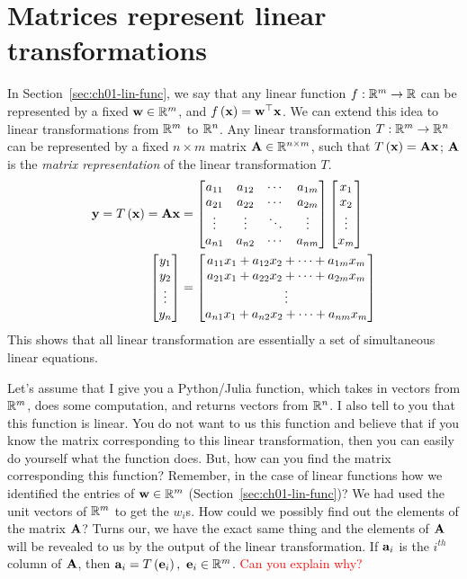 \section{Matrices represent linear transformations}\label{sec:ch03-mat-lin-trans}
In Section~\ref{sec:ch01-lin-func}, we say that any linear function $f: \mathbb{R}^m \to \mathbb{R}$ can be represented by a fixed $\mathbf{w} \in \mathbb{R}^m$, and $f\left( \mathbf{x}\right) = \mathbf{w}^\top\mathbf{x}$. We can extend this idea to linear transformations from $\mathbb{R}^m$ to $\mathbb{R}^n$. Any linear transformation $T: \mathbb{R}^m \to \mathbb{R}^n$ can be represented by a fixed $n \times m$ matrix $\mathbf{A} \in \mathbb{R}^{n \times m}$, such that $T\left( \mathbf{x}\right) = \mathbf{A}\mathbf{x}$; $\mathbf{A}$ is the \textit{matrix representation} of the linear transformation $T$.
\begin{equation}
    \begin{split}
        \mf{y} = T\pp{\mf{x}} = \mf{A}\mf{x} &= \bmxc a_{11} & a_{12} & \cdots & a_{1m}\\ a_{21} & a_{22} & \cdots & a_{2m}\\ \vdots & \vdots & \ddots & \vdots\\ a_{n1} & a_{n2} & \cdots & a_{nm} \emx \bmxc x_1 \\ x_2 \\ \vdots \\ x_m\emx \\
        \bmxc y_1 \\ y_2 \\ \vdots \\ y_n \emx &= \bmxc a_{11}x_1 + a_{12}x_2 + \cdots + a_{1m}x_m \\ 
        a_{21}x_1 + a_{22}x_2 + \cdots + a_{2m}x_m \\
        \vdots \\
        a_{n1}x_1 + a_{n2}x_2 + \cdots + a_{nm}x_m\emx 
    \end{split}
    \label{eq:ch03-lin-trans-mat-rep}
\end{equation}
This shows that all linear transformation are essentially a set of simultaneous linear equations.

Let's assume that I give you a Python/Julia function, which takes in vectors from $\mathbb{R}^m$, does some computation, and returns vectors from $\mathbb{R}^n$. I also tell to you that this function is linear. You do not want to us this function and believe that if you know the matrix corresponding to this linear transformation, then you can easily do yourself what the function does. But, how can you find the matrix corresponding this function? Remember, in the case of linear functions how we identified the entries of $\mathbf{w} \in \mathbb{R}^m$ (Section~\ref{sec:ch01-lin-func})? We had used the unit vectors of $\mathbb{R}^m$ to get  the $w_i$s. How could we possibly find out the elements of the matrix $\mathbf{A}$? Turns our, we have the exact same thing and the elements of $\mathbf{A}$ will be revealed to us by the output of the linear transformation. If $\mathbf{a}_i$ is the $i^{th}$ column of $\mathbf{A}$, then 
$\mathbf{a}_i = T\left( \mathbf{e}_i\right), \,\, \mathbf{e}_i \in \mathbb{R}^m$. \textcolor{red}{Can you explain why?}

